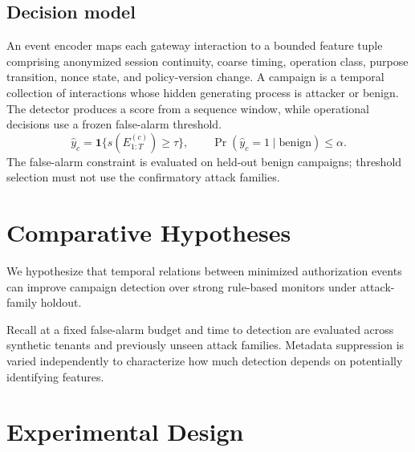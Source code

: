 \documentclass[11pt,a4paper]{article}
\begin{document}
\subsection{Decision model}
An event encoder maps each gateway interaction to a bounded feature tuple comprising anonymized session continuity, coarse timing, operation class, purpose transition, nonce state, and policy-version change. A campaign is a temporal collection of interactions whose hidden generating process is attacker or benign. The detector produces a score from a sequence window, while operational decisions use a frozen false-alarm threshold.
\begin{equation}
\hat y_c=\mathbf{1}\{s(E_{1:T}^{(c)})\ge\tau\},\qquad
\Pr(\hat y_c=1\mid\mathrm{benign})\le\alpha.
\end{equation}
The false-alarm constraint is evaluated on held-out benign campaigns; threshold selection must not use the confirmatory attack families.

\section{Comparative Hypotheses}
We hypothesize that temporal relations between minimized authorization events can improve campaign detection over strong rule-based monitors under attack-family holdout.

Recall at a fixed false-alarm budget and time to detection are evaluated across synthetic tenants and previously unseen attack families. Metadata suppression is varied independently to characterize how much detection depends on potentially identifying features.

\section{Experimental Design}
\end{document}
